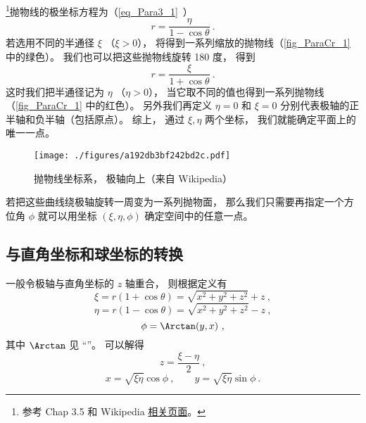 

\footnote{参考 \cite{Bransden} Chap 3.5 和 Wikipedia \href{https://en.wikipedia.org/wiki/Parabolic_coordinates}{相关页面}。}抛物线的极坐标方程为（\autoref{eq_Para3_1}~）
\begin{equation}\label{eq_ParaCr_1}
r = \frac{\eta}{1 - \cos \theta }~.
\end{equation}
若选用不同的半通径 $\xi$ （$\xi > 0$）， 将得到一系列缩放的抛物线（\autoref{fig_ParaCr_1} 中的绿色）。 我们也可以把这些抛物线旋转 180 度， 得到
\begin{equation}
r = \frac{\xi}{1 + \cos \theta }~.
\end{equation}
这时我们把半通径记为 $\eta$ （$\eta > 0$）， 当它取不同的值也得到一系列抛物线（\autoref{fig_ParaCr_1} 中的红色）。 另外我们再定义 $\eta = 0$ 和 $\xi = 0$ 分别代表极轴的正半轴和负半轴（包括原点）。 综上， 通过 $\xi, \eta$ 两个坐标， 我们就能确定平面上的唯一一点。

\begin{figure}[ht]
\centering
\texttt{[image: ./figures/a192db3bf242bd2c.pdf]}
\caption{抛物线坐标系， 极轴向上（来自 Wikipedia）} \label{fig_ParaCr_1}
\end{figure}

若把这些曲线绕极轴旋转一周变为一系列抛物面， 那么我们只需要再指定一个方位角 $\phi$ 就可以用坐标 $(\xi, \eta, \phi)$ 确定空间中的任意一点。

\subsection{与直角坐标和球坐标的转换}
一般令极轴与直角坐标的 $z$ 轴重合， 则根据定义有
\begin{equation}
\xi = r(1 + \cos\theta) = \sqrt{x^2 + y^2 + z^2} + z~,
\end{equation}
\begin{equation}
\eta = r(1 - \cos\theta) = \sqrt{x^2 + y^2 + z^2} - z~,
\end{equation}
\begin{equation}
\phi = \Arctan(y, x)~,
\end{equation}
其中 $\Arctan$ 见 “”。 可以解得
\begin{equation}\label{eq_ParaCr_2}
z = \frac{\xi - \eta}{2}~,
\end{equation}
\begin{equation}\label{eq_ParaCr_3}
x = \sqrt{\xi\eta}\cos\phi ~,\qquad
y = \sqrt{\xi\eta}\sin\phi~.
\end{equation}

